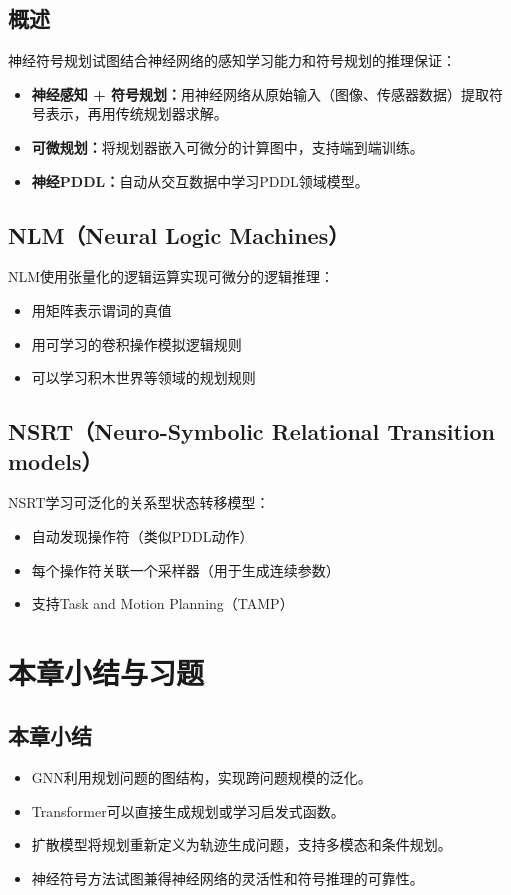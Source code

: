 \subsection{概述}

神经符号规划试图结合神经网络的感知学习能力和符号规划的推理保证：

\begin{itemize}
  \item \textbf{神经感知 + 符号规划：}用神经网络从原始输入（图像、传感器数据）提取符号表示，再用传统规划器求解。
  \item \textbf{可微规划：}将规划器嵌入可微分的计算图中，支持端到端训练。
  \item \textbf{神经PDDL：}自动从交互数据中学习PDDL领域模型。
\end{itemize}

\subsection{NLM（Neural Logic Machines）}

NLM使用张量化的逻辑运算实现可微分的逻辑推理：
\begin{itemize}
  \item 用矩阵表示谓词的真值
  \item 用可学习的卷积操作模拟逻辑规则
  \item 可以学习积木世界等领域的规划规则
\end{itemize}

\subsection{NSRT（Neuro-Symbolic Relational Transition models）}

NSRT学习可泛化的关系型状态转移模型：
\begin{itemize}
  \item 自动发现操作符（类似PDDL动作）
  \item 每个操作符关联一个采样器（用于生成连续参数）
  \item 支持Task and Motion Planning（TAMP）
\end{itemize}

\section{本章小结与习题}

\subsection*{本章小结}
\begin{itemize}
  \item GNN利用规划问题的图结构，实现跨问题规模的泛化。
  \item Transformer可以直接生成规划或学习启发式函数。
  \item 扩散模型将规划重新定义为轨迹生成问题，支持多模态和条件规划。
  \item 神经符号方法试图兼得神经网络的灵活性和符号推理的可靠性。
\end{itemize}

